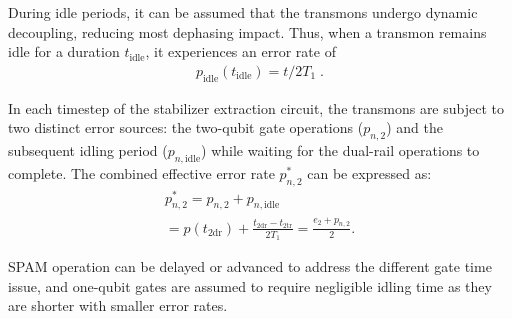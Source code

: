 \documentclass[twocolumn,
notitlepage,
aps,
prx,
floatfix,
superscriptaddress
]{revtex4-2}
\begin{document}
During idle periods, it can be assumed that the transmons undergo dynamic decoupling, reducing most dephasing impact.
Thus, when a transmon remains idle for a duration $t_\text{idle}$, it experiences an error rate of
\begin{align}
    p_\text{idle} (t_\text{idle}) = t / 2T_1 \;.
\end{align}

In each timestep of the stabilizer extraction circuit, the transmons are subject to two distinct error sources: the two-qubit gate operations ($p_{n,2}$) and the subsequent idling period ($p_{n,\text{idle}}$) while waiting for the dual-rail operations to complete. The combined effective error rate $p^*_{n,2}$ can be expressed as:
\begin{multline}
    p^*_{n,2} = p_{n,2} + p_{n,\text{idle}} \\ = p(t_{2\text{dr}}) + \frac{t_{2\text{dr}}- t_{2\text{tr}}}{2 T_1} = \frac{e_2 + p_{n,2}}{2}.
\end{multline}

SPAM operation can be delayed or advanced to address the different gate time issue, and one-qubit gates are assumed to require negligible idling time as they are shorter with smaller error rates.


% 


\end{document}
